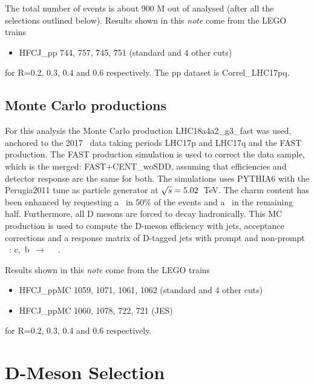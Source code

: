 The total number of events is about 900  M  out of  analysed (after all the selections outlined below).
Results shown in this {\it note} come from the LEGO trains 
\begin{itemize}
\item HFCJ\_pp 744, 757, 745, 751 (standard and 4 other cuts)
\end{itemize}
 for R=0.2, 0.3, 0.4 and 0.6 respectively.
The pp dataset is Correl\_LHC17pq. 
\subsection{Monte Carlo productions}

For this analysis the Monte Carlo production LHC18a4a2\_g3\_fast was used, anchored to the 2017 \pp\ data taking periods LHC17p and LHC17q and the FAST production. The FAST production simulation is used to correct the data sample, which is the merged: FAST+CENT\_woSDD, assuming that efficiencies and detector response are the same for both.
The simulations uses PYTHIA6 with the Perugia2011 tune as particle generator at $\sqrt{s}=5.02$~TeV.
The charm content has been enhanced by requesting a \ccbar\ in 50\% of the events and a \bbbar\ in the remaining half.
Furthermore, all D mesons are forced to decay hadronically.
This MC production is used to compute the D-meson efficiency with jets, acceptance corrections and a response matrix of D-tagged jets with prompt and non-prompt \Dzero\ : c,~b~$\rightarrow$ ~\Dzero\ .

Results shown in this {\it note} come from the LEGO trains 
\begin{itemize}
\item HFCJ\_ppMC 1059, 1071, 1061, 1062 (standard and 4 other cuts)
\item HFCJ\_ppMC 1060, 1078, 722, 721 (JES)
\end{itemize}
 for R=0.2, 0.3, 0.4 and 0.6 respectively.

\section{D-Meson Selection}
\label{sec:DmesonSel}

